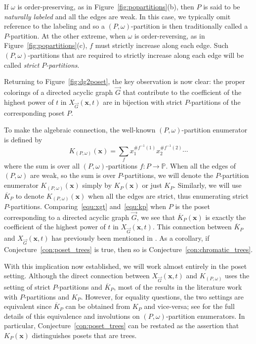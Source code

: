 \documentclass[ALCO,Unicode,published]{cedram}
\newcommand{\diG}{\overrightarrow{G}}
\newcommand{\x}{\mathbf{x}}
\newcommand{\om}{\omega}
\newcommand{\KK}[1]{\overline{K}_{#1}}
\newcommand{\kpw}{K_{(P,\om)}}
\begin{document}
If $\om$ is order-preserving, as in Figure~\ref{fig:popartitions}(b), then $P$ is said to be \emph{naturally labeled} and all the edges are weak.  In this case, we typically omit reference to the labeling and so a $(P,\om)$-partition is then traditionally called a $P$-partition.  At the other extreme, when $\om$ is order-reversing, as in Figure~\ref{fig:popartitions}(c), $f$ must strictly increase along each edge. Such $(P,\om)$-partitions that are required to strictly increase along each edge will be called \emph{strict $P$-partitions}.  

Returning to Figure~\ref{fig:dg2poset}, the key observation is now clear: the proper colorings of a directed acyclic graph $\diG$ that contribute to the coefficient of the highest power of $t$ in $X_{\diG}(\x,t)$ are in bijection with strict $P$-partitions of the corresponding poset $P$.  

To make the algebraic connection, the well-known $(P,\om)$-partition enumerator is defined by 
\begin{equation}\label{equ:kp}
\kpw(\x) = \sum_{f} x_1^{\#f^{-1}(1)} x_2^{\# f^{-1}(2)} \cdots
\end{equation}
where the sum is over all $(P,\om)$-partitions $f:P \to \mathbb{P}$.  When all the edges of $(P,\om)$ are weak, so the sum is over $P$-partitions, we will denote the $P$-partition enumerator $\kpw(\x)$ simply by $K_P(\x)$ or just $K_P$.  Similarly, we will use $\KK{P}$ to denote $\kpw(\x)$ when all the edges are strict, thus enumerating strict $P$-partitions.  Comparing~\eqref{equ:xgt} and~\eqref{equ:kp} when $P$ is the poset corresponding to a directed acyclic graph $\diG$, we see that $\KK{P}(\x)$  is exactly the coefficient of the highest power of $t$ in $X_{\diG}(\x,t)$.   This connection between $\KK{P}$ and $X_{\diG}(\x, t)$ has previously been mentioned in \cite[Theorem~7.4]{AlSu21} \cite[p.~11]{Ell17+}.  As a corollary, if Conjecture~\ref{con:poset_trees} is true, then so is Conjecture~\ref{con:chromatic_trees}.

With this implication now established, we will work almost entirely in the poset setting.  Although the direct connection between $X_{\diG}(\x, t)$ and $\kpw$ uses the setting of strict $P$-partitions and $\KK{P}$, most of the results in the literature work with $P$-partitions and $K_P$.  However, for equality questions, the two settings are equivalent since $\KK{P}$ can be obtained from $K_P$ and vice-versa; see \cite[\S 3]{McWa14} for the full details of this equivalence and involutions on $(P,\om)$-partition enumerators.  In particular, Conjecture~\ref{con:poset_trees} can be restated as the assertion that $K_P(\x)$ distinguishes posets that are trees.
\end{document}
